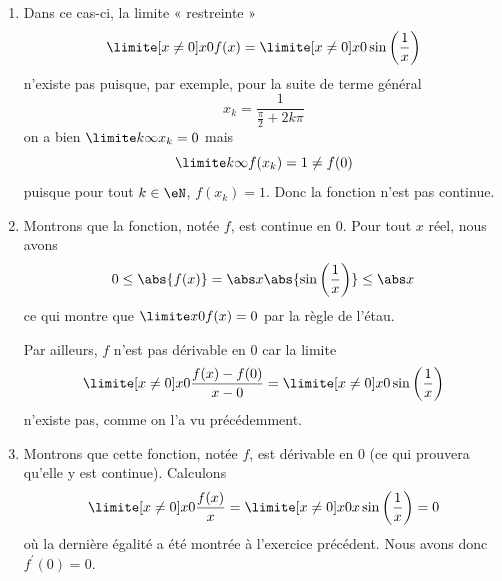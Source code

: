 \begin{example}
\begin{enumerate}
		\item
		      Dans ce cas-ci, la limite « restreinte »
		      \begin{equation*}
			      \limite[x \neq 0] x 0 f(x) = \limite[x \neq 0] x 0 \sin\left(\frac 1 x\right)
		      \end{equation*}
		      n'existe pas puisque, par exemple, pour la suite de terme général
		      \begin{equation*}
			      x_k = \frac 1 {\frac \pi 2 + 2k \pi}
		      \end{equation*}
		      on a bien $\limite k \infty x_k = 0$ mais
		      \begin{equation*}
			      \limite k \infty f(x_k) = 1 \neq f(0)
		      \end{equation*}
		      puisque pour tout $k \in \eN$, $f(x_k) = 1$. Donc la fonction n'est pas continue.

		\item
		      Montrons que la fonction, notée $f$, est continue en $0$. Pour tout $x$ réel, nous avons
		      \begin{equation*}
			      0 \leq \abs{f(x)} = \abs x \abs{\sin \left(\frac 1 x\right)} \leq
			      \abs x
		      \end{equation*}
		      ce qui montre que $\limite x 0 f(x) = 0$ par la règle de l'étau.

		      Par ailleurs, $f$ n'est pas dérivable en $0$ car la limite
		      \begin{equation*}
			      \limite[x \neq 0] x 0 \frac{f(x) - f(0)}{x-0} = \limite[x\neq 0] x 0 \sin\left(\frac{1}{x}\right)
		      \end{equation*}
		      n'existe pas, comme on l'a vu précédemment.

		\item
		      Montrons que cette fonction, notée $f$, est
		      dérivable en $0$ (ce qui prouvera qu'elle y est continue). Calculons
		      \begin{equation*}
			      \limite[x \neq 0] x 0 \frac{f(x)}{x} = \limite[x\neq 0] x 0 x \sin
			      \left(
			      \frac 1 x
			      \right) = 0
		      \end{equation*}
		      où la dernière égalité a été montrée à l'exercice précédent. Nous
		      avons donc $f^\prime(0) = 0$.


\end{enumerate}
\end{example}
